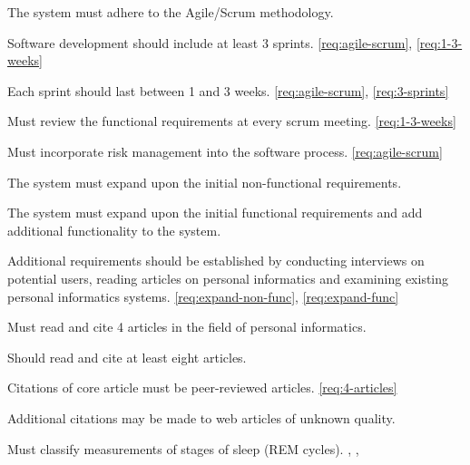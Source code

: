 

{The system must adhere to the Agile/Scrum methodology.}
{\phigh}
{\dnone}
{\sspec}

{Software development should include at least 3 sprints.}
{\pmed}
{\ref{req:agile-scrum}, \ref{req:1-3-weeks}}
{\sspec}

{Each sprint should last between 1 and 3 weeks.}
{\pmed}
{\ref{req:agile-scrum}, \ref{req:3-sprints}}
{\sspec}

{Must review the functional requirements at every scrum meeting.}
{\phigh}
{\ref{req:1-3-weeks}}
{\sspec}

{Must incorporate risk management into the software process.}
{\phigh}
{\ref{req:agile-scrum}}
{\sspec}


{The system must expand upon the initial non-functional requirements.}
{\phigh}
{\dnone}
{\sspec}

{The system must expand upon the initial functional requirements and add additional functionality
  to the system.}
{\phigh}
{\dnone}
{\sspec}

{Additional requirements should be established by conducting interviews on potential users,
  reading articles on personal informatics and examining existing personal informatics systems.}
{\phigh}
{\ref{req:expand-non-func}, \ref{req:expand-func}}
{\sspec}


{Must read and cite 4 articles in the field of personal informatics.}
{\phigh}
{\dnone}
{\sspec}

{Should read and cite at least eight articles.}
{\pmed}
{\dnone}
{\sspec}

{Citations of core article must be peer-reviewed articles.}
{\phigh}
{\ref{req:4-articles}}
{\sspec}

{Additional citations may be made to web articles of unknown quality.}
{\plow}
{\dnone}
{\sspec}

{Must classify measurements of stages of sleep (REM cycles).}
{\phigh}
{\dnone}
{\textcite{Tuck:2018aa}, \textcite{Feinberg:1988aa}, \textcite[p.291]{Carlson:2012aa}}

